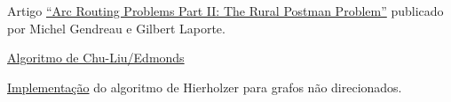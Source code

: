 \documentclass[12pt, a4paper]{article}
\begin{document}
\begin{thebibliography}{9}

    Artigo \href{https://pubsonline.informs.org/doi/10.1287/opre.43.3.399}{``Arc Routing Problems Part II: The Rural Postman Problem''} publicado por Michel Gendreau e Gilbert Laporte.

%

    \href{https://en.wikipedia.org/wiki/Edmonds\%27\_algorithm}{Algoritmo de Chu-Liu/Edmonds}

    \href{https://github.com/gafeol/chinese-postman/blob/master/euler_hierholzer_undirected.cpp}{Implementação} do algoritmo de Hierholzer para grafos não direcionados.

	\end{thebibliography}
 
\end{document}
